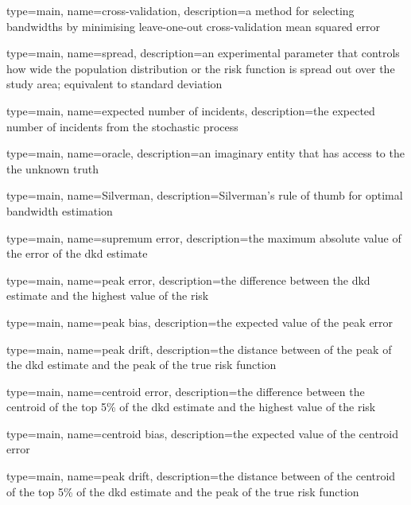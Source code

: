 

 {
   type=main,
   name={cross-validation},
   description={a method for selecting bandwidths by minimising leave-one-out cross-validation mean squared error}
}

 {
   type=main,
   name={spread},
   description={an experimental parameter that controls how wide the population distribution or the risk function is spread out over the study area; equivalent to standard deviation}
}

{%
   type=main,
   name={expected number of incidents},
   description={the expected number of incidents from the stochastic process}
}

 {
   type=main,
   name={oracle},
   description={an imaginary entity that has access to the the unknown truth}
}

 {
   type=main,
   name={Silverman},
   description={Silverman's rule of thumb for optimal bandwidth estimation}
}

{%
   type=main,
   name={supremum error},
   description={the maximum absolute value of the error of the dkd estimate}
}

{%
   type=main,
   name={peak error},
   description={the difference between the dkd estimate and the highest value of the risk}
}

{%
   type=main,
   name={peak bias},
   description={the expected value of the peak error}
}

{%
   type=main,
   name={peak drift},
   description={the distance between of the peak of the dkd estimate and the peak of the true risk function}
}

{%
   type=main,
   name={centroid error},
   description={the difference between the centroid of the top 5\% of the dkd estimate and the highest value of the risk}
}

{%
   type=main,
   name={centroid bias},
   description={the expected value of the centroid error}
}

{%
   type=main,
   name={peak drift},
   description={the distance between of the centroid of the top 5\% of the dkd estimate and the peak of the true risk function}
}



